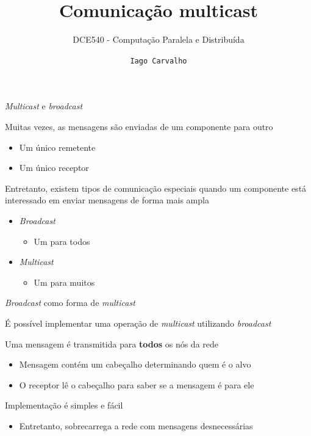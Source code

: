 \documentclass[compress]{beamer}
\title{Comunicação multicast}
\subtitle{DCE540 - Computação Paralela e Distribuída}
\author{\texttt{Iago Carvalho}}
\institute{\texttt{Departamento de Ciência da Computação}}
\begin{document}
\begin{frame}
\titlepage

\end{frame}


\begin{frame}{\textit{Multicast} e \textit{broadcast}}

Muitas vezes, as mensagens são enviadas de um componente para outro
\begin{itemize}
    \item Um único remetente
    \item Um único receptor
\end{itemize}

\vspace{0.5cm}

Entretanto, existem tipos de comunicação especiais quando um componente está interessado em enviar mensagens de forma mais ampla
\begin{itemize}
    \item \textit{Broadcast}
    \begin{itemize}
        \item Um para todos
    \end{itemize}
    \item \textit{Multicast}
    \begin{itemize}
        \item Um para muitos
    \end{itemize}
\end{itemize}
\end{frame}


\begin{frame}{\textit{Broadcast} como forma de \textit{multicast}}

É possível implementar uma operação de \textit{multicast} utilizando \textit{broadcast}

\vspace{0.5cm}

Uma mensagem é transmitida para \textbf{todos} os nós da rede
\begin{itemize}
    \item Mensagem contém um cabeçalho determinando quem é o alvo
    \item O receptor lê o cabeçalho para saber se a mensagem é para ele
\end{itemize}

\vspace{0.5cm}

Implementação é simples e fácil
\begin{itemize}
    \item Entretanto, sobrecarrega a rede com mensagens desnecessárias
\end{itemize}
\end{frame}
\end{document}
